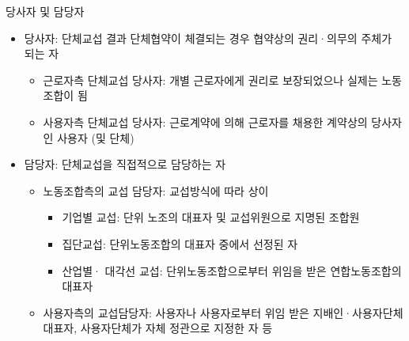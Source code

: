 \documentclass[aspectratio=169,xcolor=dvipsnames,handout]{beamer}
\begin{document}
\begin{frame}[allowframebreaks]{당사자 및 담당자}
    \begin{itemize}[<+->]
        \item 당사자: 단체교섭 결과 단체협약이 체결되는 경우 협약상의 권리·의무의 주체가 되는 자
        \begin{itemize}[<+->]
            \item 근로자측 단체교섭 당사자: 개별 근로자에게 권리로 보장되었으나 실제는 노동조합이 됨
            \item 사용자측 단체교섭 당사자: 근로계약에 의해 근로자를 채용한 계약상의 당사자인 사용자 (및 단체)
        \end{itemize}
    \framebreak\relax
    \item 담당자: 단체교섭을 직접적으로 담당하는 자
        \begin{itemize}[<+->]
            \item 노동조합측의 교섭 담당자: 교섭방식에 따라 상이
        \begin{itemize}[<+->]
            \item 기업별 교섭: 단위 노조의 대표자 및 교섭위원으로 지명된 조합원
            \item 집단교섭: 단위노동조합의 대표자 중에서 선정된 자
            \item 산업별· 대각선 교섭: 단위노동조합으로부터 위임을 받은 연합노동조합의 대표자
        \end{itemize}
    \item 사용자측의 교섭담당자: 사용자나 사용자로부터 위임 받은 지배인·사용자단체 대표자, 사용자단체가 자체 정관으로 지정한 자 등
        \end{itemize}
    \end{itemize}
\end{frame}
\end{document}
